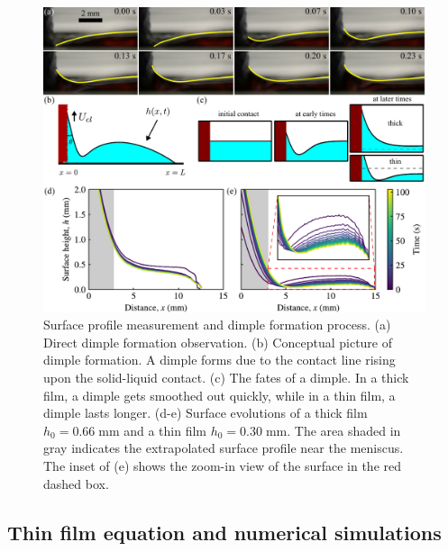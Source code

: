 \documentclass[aps,prfluids,amsmath,amssymb,superscriptaddress,longbibliography]{revtex4-2}
\begin{document}
\begin{figure}
    \centering
    \includegraphics[width=.8\linewidth]{dimple_formation_process_v4}
    \caption{
    Surface profile measurement and dimple formation process.
    (a) Direct dimple formation observation.
    (b) Conceptual picture of dimple formation. A dimple forms due to the contact line rising upon the solid-liquid contact.
    (c) The fates of a dimple. In a thick film, a dimple gets smoothed out quickly, while in a thin film, a dimple lasts longer. 
    (d-e) Surface evolutions of a thick film $h_0=0.66\;\mathrm{mm}$ and a thin film $h_0=0.30\;\mathrm{mm}$. The area shaded in gray indicates the extrapolated surface profile near the meniscus.
    The inset of (e) shows the zoom-in view of the surface in the red dashed box.
    }
    \label{fig:dimple-formation-process}
\end{figure}



\subsection{Thin film equation and numerical simulations}
\end{document}
